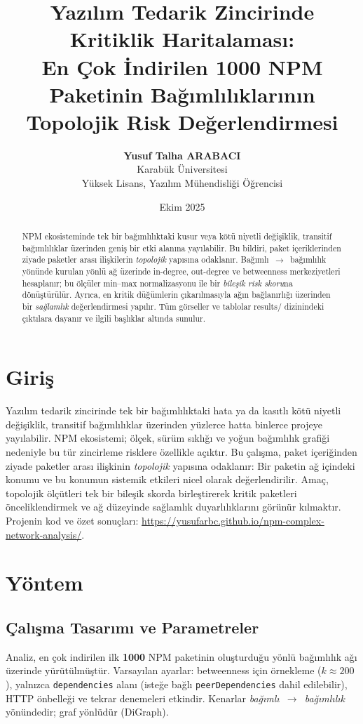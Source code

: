 \documentclass[11pt,a4paper]{article}
\title{Yazılım Tedarik Zincirinde Kritiklik Haritalaması:\\En Çok İndirilen 1000 NPM Paketinin Bağımlılıklarının Topolojik Risk Değerlendirmesi }
\author{\textbf{Yusuf Talha ARABACI}\\Karabük Üniversitesi\\Yüksek Lisans, Yazılım Mühendisliği Öğrencisi}
\date{Ekim 2025}
\begin{document}
\maketitle

\begin{abstract}
NPM ekosisteminde tek bir bağımlılıktaki kusur veya kötü niyetli değişiklik, transitif bağımlılıklar üzerinden geniş bir etki alanına yayılabilir. Bu bildiri, paket içeriklerinden ziyade paketler arası ilişkilerin \emph{topolojik} yapısına odaklanır. Bağımlı~$\to$~bağımlılık yönünde kurulan yönlü ağ üzerinde in-degree, out-degree ve betweenness merkeziyetleri hesaplanır; bu ölçüler min–max normalizasyonu ile bir \emph{bileşik risk skoru}na dönüştürülür. Ayrıca, en kritik düğümlerin çıkarılmasıyla ağın bağlanırlığı üzerinden bir \emph{sağlamlık} değerlendirmesi yapılır. Tüm görseller ve tablolar results/ dizinindeki çıktılara dayanır ve ilgili başlıklar altında sunulur.
\end{abstract}

\clearpage

\section{Giriş}
Yazılım tedarik zincirinde tek bir bağımlılıktaki hata ya da kasıtlı kötü niyetli değişiklik, transitif bağımlılıklar üzerinden yüzlerce hatta binlerce projeye yayılabilir. NPM ekosistemi; ölçek, sürüm sıklığı ve yoğun bağımlılık grafiği nedeniyle bu tür zincirleme risklere özellikle açıktır. Bu çalışma, paket içeriğinden ziyade paketler arası ilişkinin \emph{topolojik} yapısına odaklanır: Bir paketin ağ içindeki konumu ve bu konumun sistemik etkileri nicel olarak değerlendirilir. Amaç, topolojik ölçütleri tek bir bileşik skorda birleştirerek kritik paketleri önceliklendirmek ve ağ düzeyinde sağlamlık duyarlılıklarını görünür kılmaktır.\\Projenin kod ve özet sonuçları: \url{https://yusufarbc.github.io/npm-complex-network-analysis/}.

\section{Yöntem}
\subsection{Çalışma Tasarımı ve Parametreler}
Analiz, en çok indirilen ilk \textbf{1000} NPM paketinin oluşturduğu yönlü bağımlılık ağı üzerinde yürütülmüştür. Varsayılan ayarlar: betweenness için örnekleme (\(k\approx200\)), yalnızca \texttt{dependencies} alanı (isteğe bağlı \texttt{peerDependencies} dahil edilebilir), HTTP önbelleği ve tekrar denemeleri etkindir. Kenarlar \emph{bağımlı~$\to$~bağımlılık} yönündedir; graf yönlüdür (DiGraph).
\end{document}
